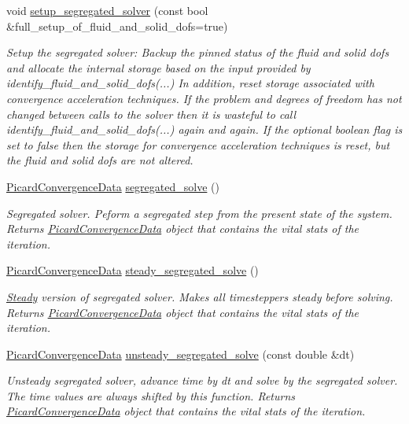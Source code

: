 \begin{DoxyCompactItemize}
void \hyperlink{classoomph_1_1SegregatableFSIProblem_a12e662227e5daf656244a531f40022f9}{setup\+\_\+segregated\+\_\+solver} (const bool \&full\+\_\+setup\+\_\+of\+\_\+fluid\+\_\+and\+\_\+solid\+\_\+dofs=true)
\begin{DoxyCompactList}\small\item\em Setup the segregated solver\+: Backup the pinned status of the fluid and solid dofs and allocate the internal storage based on the input provided by identify\+\_\+fluid\+\_\+and\+\_\+solid\+\_\+dofs(...) In addition, reset storage associated with convergence acceleration techniques. If the problem and degrees of freedom has not changed between calls to the solver then it is wasteful to call identify\+\_\+fluid\+\_\+and\+\_\+solid\+\_\+dofs(...) again and again. If the optional boolean flag is set to false then the storage for convergence acceleration techniques is reset, but the fluid and solid dofs are not altered. \end{DoxyCompactList}\item 
\hyperlink{classoomph_1_1PicardConvergenceData}{Picard\+Convergence\+Data} \hyperlink{classoomph_1_1SegregatableFSIProblem_a87a69561674c1e596bb205e0fc4a387f}{segregated\+\_\+solve} ()
\begin{DoxyCompactList}\small\item\em Segregated solver. Peform a segregated step from the present state of the system. Returns \hyperlink{classoomph_1_1PicardConvergenceData}{Picard\+Convergence\+Data} object that contains the vital stats of the iteration. \end{DoxyCompactList}\item 
\hyperlink{classoomph_1_1PicardConvergenceData}{Picard\+Convergence\+Data} \hyperlink{classoomph_1_1SegregatableFSIProblem_a8f8145df86358916df505e2b513caf6a}{steady\+\_\+segregated\+\_\+solve} ()
\begin{DoxyCompactList}\small\item\em \hyperlink{classoomph_1_1Steady}{Steady} version of segregated solver. Makes all timesteppers steady before solving. Returns \hyperlink{classoomph_1_1PicardConvergenceData}{Picard\+Convergence\+Data} object that contains the vital stats of the iteration. \end{DoxyCompactList}\item 
\hyperlink{classoomph_1_1PicardConvergenceData}{Picard\+Convergence\+Data} \hyperlink{classoomph_1_1SegregatableFSIProblem_aae43b43dbc197d238535bcb5c3acf168}{unsteady\+\_\+segregated\+\_\+solve} (const double \&dt)
\begin{DoxyCompactList}\small\item\em Unsteady segregated solver, advance time by dt and solve by the segregated solver. The time values are always shifted by this function. Returns \hyperlink{classoomph_1_1PicardConvergenceData}{Picard\+Convergence\+Data} object that contains the vital stats of the iteration. \end{DoxyCompactList}\item 

\end{DoxyCompactItemize}
